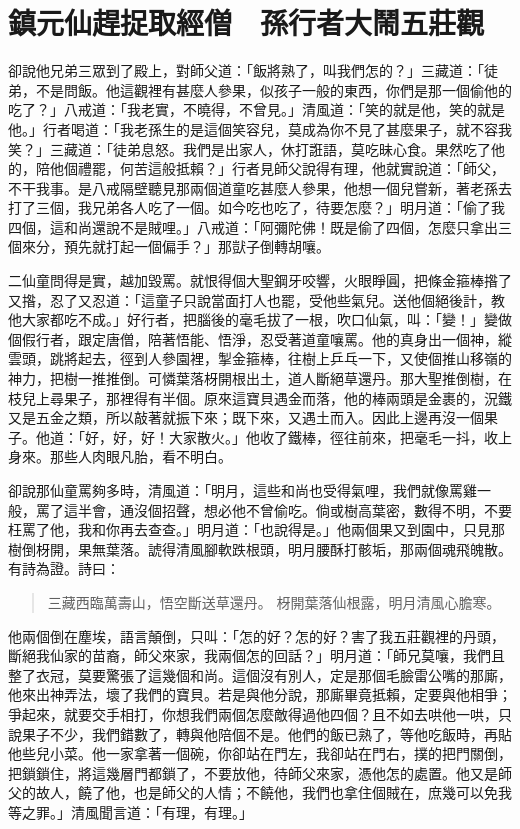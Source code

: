 
\chapter{鎮元仙趕捉取經僧　孫行者大鬧五莊觀}

卻說他兄弟三眾到了殿上，對師父道：「飯將熟了，叫我們怎的？」三藏道：「徒弟，不是問飯。他這觀裡有甚麼人參果，似孩子一般的東西，你們是那一個偷他的吃了？」八戒道：「我老實，不曉得，不曾見。」清風道：「笑的就是他，笑的就是他。」行者喝道：「我老孫生的是這個笑容兒，莫成為你不見了甚麼果子，就不容我笑？」三藏道：「徒弟息怒。我們是出家人，休打誑語，莫吃昧心食。果然吃了他的，陪他個禮罷，何苦這般抵賴？」行者見師父說得有理，他就實說道：「師父，不干我事。是八戒隔壁聽見那兩個道童吃甚麼人參果，他想一個兒嘗新，著老孫去打了三個，我兄弟各人吃了一個。如今吃也吃了，待要怎麼？」明月道：「偷了我四個，這和尚還說不是賊哩。」八戒道：「阿彌陀佛！既是偷了四個，怎麼只拿出三個來分，預先就打起一個偏手？」那獃子倒轉胡嚷。

二仙童問得是實，越加毀罵。就恨得個大聖鋼牙咬響，火眼睜圓，把條金箍棒揝了又揝，忍了又忍道：「這童子只說當面打人也罷，受他些氣兒。送他個絕後計，教他大家都吃不成。」好行者，把腦後的毫毛拔了一根，吹口仙氣，叫：「變！」變做個假行者，跟定唐僧，陪著悟能、悟淨，忍受著道童嚷罵。他的真身出一個神，縱雲頭，跳將起去，徑到人參園裡，掣金箍棒，往樹上乒乓一下，又使個推山移嶺的神力，把樹一推推倒。可憐葉落枒開根出土，道人斷絕草還丹。那大聖推倒樹，在枝兒上尋果子，那裡得有半個。原來這寶貝遇金而落，他的棒兩頭是金裹的，況鐵又是五金之類，所以敲著就振下來；既下來，又遇土而入。因此上邊再沒一個果子。他道：「好，好，好！大家散火。」他收了鐵棒，徑往前來，把毫毛一抖，收上身來。那些人肉眼凡胎，看不明白。

卻說那仙童罵夠多時，清風道：「明月，這些和尚也受得氣哩，我們就像罵雞一般，罵了這半會，通沒個招聲，想必他不曾偷吃。倘或樹高葉密，數得不明，不要枉罵了他，我和你再去查查。」明月道：「也說得是。」他兩個果又到園中，只見那樹倒枒開，果無葉落。諕得清風腳軟跌根頭，明月腰酥打骸垢，那兩個魂飛魄散。有詩為證。詩曰：
\begin{quote}
三藏西臨萬壽山，悟空斷送草還丹。
枒開葉落仙根露，明月清風心膽寒。
\end{quote}

他兩個倒在塵埃，語言顛倒，只叫：「怎的好？怎的好？害了我五莊觀裡的丹頭，斷絕我仙家的苗裔，師父來家，我兩個怎的回話？」明月道：「師兄莫嚷，我們且整了衣冠，莫要驚張了這幾個和尚。這個沒有別人，定是那個毛臉雷公嘴的那廝，他來出神弄法，壞了我們的寶貝。若是與他分說，那廝畢竟抵賴，定要與他相爭；爭起來，就要交手相打，你想我們兩個怎麼敵得過他四個？且不如去哄他一哄，只說果子不少，我們錯數了，轉與他陪個不是。他們的飯已熟了，等他吃飯時，再貼他些兒小菜。他一家拿著一個碗，你卻站在門左，我卻站在門右，撲的把門關倒，把鎖鎖住，將這幾層門都鎖了，不要放他，待師父來家，憑他怎的處置。他又是師父的故人，饒了他，也是師父的人情；不饒他，我們也拿住個賊在，庶幾可以免我等之罪。」清風聞言道：「有理，有理。」

